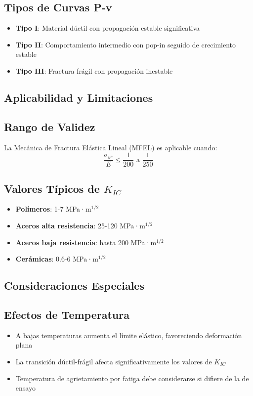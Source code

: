 \documentclass[12pt,letterpaper]{article}
\begin{document}
\subsection{Tipos de Curvas P-v}
\begin{itemize}
\item \textbf{Tipo I}: Material dúctil con propagación estable significativa
\item \textbf{Tipo II}: Comportamiento intermedio con pop-in seguido de crecimiento estable
\item \textbf{Tipo III}: Fractura frágil con propagación inestable
\end{itemize}

\subsection{Aplicabilidad y Limitaciones}

\subsection{Rango de Validez}
La Mecánica de Fractura Elástica Lineal (MFEL) es aplicable cuando:
\[\frac{\sigma_{ys}}{E} \leq \frac{1}{200} \text{ a } \frac{1}{250}\]

\subsection{Valores Típicos de $K_{IC}$}
\begin{itemize}
\item \textbf{Polímeros}: 1-7 MPa·m$^{1/2}$
\item \textbf{Aceros alta resistencia}: 25-120 MPa·m$^{1/2}$
\item \textbf{Aceros baja resistencia}: hasta 200 MPa·m$^{1/2}$
\item \textbf{Cerámicas}: 0.6-6 MPa·m$^{1/2}$
\end{itemize}

\subsection{Consideraciones Especiales}

\subsection{Efectos de Temperatura}
\begin{itemize}
\item A bajas temperaturas aumenta el límite elástico, favoreciendo deformación plana
\item La transición dúctil-frágil afecta significativamente los valores de $K_{IC}$
\item Temperatura de agrietamiento por fatiga debe considerarse si difiere de la de ensayo
\end{itemize}
\end{document}
